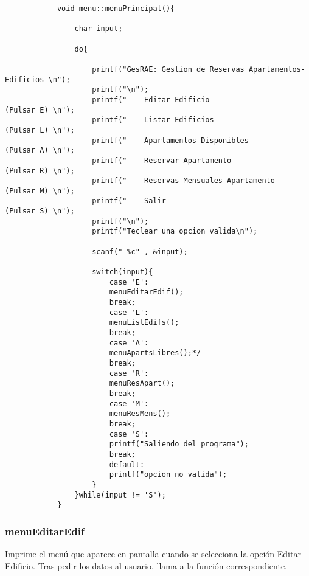 \documentclass[12pt]{article}
\begin{document}
		\begin{lstlisting}
			void menu::menuPrincipal(){
				
				char input;
				
				do{
					
					printf("GesRAE: Gestion de Reservas Apartamentos-Edificios \n");
					printf("\n");
					printf("    Editar Edificio                   (Pulsar E) \n");
					printf("    Listar Edificios                  (Pulsar L) \n");
					printf("    Apartamentos Disponibles          (Pulsar A) \n");
					printf("    Reservar Apartamento              (Pulsar R) \n");
					printf("    Reservas Mensuales Apartamento    (Pulsar M) \n");
					printf("    Salir                             (Pulsar S) \n");
					printf("\n");
					printf("Teclear una opcion valida\n");
					
					scanf(" %c" , &input);
					
					switch(input){
						case 'E':
						menuEditarEdif();
						break;
						case 'L':
						menuListEdifs();
						break;
						case 'A':
						menuApartsLibres();*/
						break;
						case 'R':
						menuResApart();
						break;
						case 'M':
						menuResMens();
						break;
						case 'S':
						printf("Saliendo del programa");
						break;
						default:
						printf("opcion no valida");
					}
				}while(input != 'S');
			}
		\end{lstlisting}	
		
		\subsubsection{menuEditarEdif}
		Imprime el menú que aparece en pantalla cuando se selecciona la opción Editar Edificio. Tras pedir los datos al usuario, llama a la función correspondiente.
		
\end{document}
